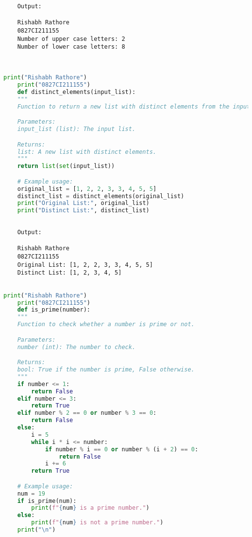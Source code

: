 \documentclass{report}
\begin{document}
\begin{verbatim}
	Output:

	Rishabh Rathore
	0827CI211155
	Number of upper case letters: 2
	Number of lower case letters: 8
	
	

\end{verbatim}


\newpage


\sol 
\begin{lstlisting}[language=Python]
	print("Rishabh Rathore")
	print("0827CI211155")
	def distinct_elements(input_list):
    """
    Function to return a new list with distinct elements from the input list.

    Parameters:
    input_list (list): The input list.

    Returns:
    list: A new list with distinct elements.
    """
    return list(set(input_list))

	# Example usage:
	original_list = [1, 2, 2, 3, 3, 4, 5, 5]
	distinct_list = distinct_elements(original_list)
	print("Original List:", original_list)
	print("Distinct List:", distinct_list)
  

\end{lstlisting}

\begin{verbatim}
	Output:

	Rishabh Rathore
	0827CI211155
	Original List: [1, 2, 2, 3, 3, 4, 5, 5]
	Distinct List: [1, 2, 3, 4, 5]


\end{verbatim}


\newpage


\sol 
\begin{lstlisting}[language=Python]
	print("Rishabh Rathore")
	print("0827CI211155")
	def is_prime(number):
    """
    Function to check whether a number is prime or not.

    Parameters:
    number (int): The number to check.

    Returns:
    bool: True if the number is prime, False otherwise.
    """
    if number <= 1:
        return False
    elif number <= 3:
        return True
    elif number % 2 == 0 or number % 3 == 0:
        return False
    else:
        i = 5
        while i * i <= number:
            if number % i == 0 or number % (i + 2) == 0:
                return False
            i += 6
        return True

	# Example usage:
	num = 19
	if is_prime(num):
		print(f"{num} is a prime number.")
	else:
		print(f"{num} is not a prime number.")
	print("\n")
\end{lstlisting}
\end{document}
